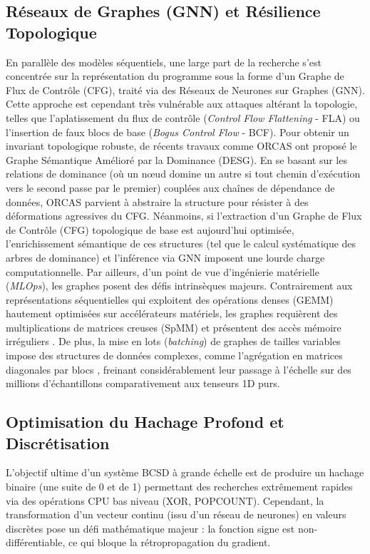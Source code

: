 \subsection{Réseaux de Graphes (GNN) et Résilience Topologique}
En parallèle des modèles séquentiels, une large part de la recherche s'est concentrée sur la représentation du programme sous la forme d'un Graphe de Flux de Contrôle (CFG), traité via des Réseaux de Neurones sur Graphes (GNN).
Cette approche est cependant très vulnérable aux attaques altérant la topologie, telles que l'aplatissement du flux de contrôle (\textit{Control Flow Flattening} - FLA) ou l'insertion de faux blocs de base (\textit{Bogus Control Flow} - BCF).
Pour obtenir un invariant topologique robuste, de récents travaux comme ORCAS \cite{wang2025orcas} ont proposé le Graphe Sémantique Amélioré par la Dominance (DESG).
En se basant sur les relations de dominance (où un nœud domine un autre si tout chemin d'exécution vers le second passe par le premier) couplées aux chaînes de dépendance de données, ORCAS \cite{wang2025orcas} parvient à abstraire la structure pour résister à des déformations agressives du CFG.
Néanmoins, si l'extraction d'un Graphe de Flux de Contrôle (CFG) topologique de base est aujourd'hui optimisée, l'enrichissement sémantique de ces structures (tel que le calcul systématique des arbres de dominance) et l'inférence via GNN imposent une lourde charge computationnelle. 
Par ailleurs, d'un point de vue d'ingénierie matérielle (\textit{MLOps}), les graphes posent des défis intrinsèques majeurs. 
Contrairement aux représentations séquentielles qui exploitent des opérations denses (GEMM) hautement optimisées sur accélérateurs matériels, les graphes requièrent des multiplications de matrices creuses (SpMM) et présentent des accès mémoire irréguliers \cite{wang2021gnnadvisor}. 
De plus, la mise en lots (\textit{batching}) de graphes de tailles variables impose des structures de données complexes, comme l'agrégation en matrices diagonales par blocs \cite{fey2019pyg}, freinant considérablement leur passage à l'échelle sur des millions d'échantillons comparativement aux tenseurs 1D purs.
\subsection{Optimisation du Hachage Profond et Discrétisation}
L'objectif ultime d'un système BCSD à grande échelle est de produire un hachage binaire (une suite de 0 et de 1) permettant des recherches extrêmement rapides via des opérations CPU bas niveau (XOR, POPCOUNT).
Cependant, la transformation d'un vecteur continu (issu d'un réseau de neurones) en valeurs discrètes pose un défi mathématique majeur : la fonction signe est non-différentiable, ce qui bloque la rétropropagation du gradient. 

